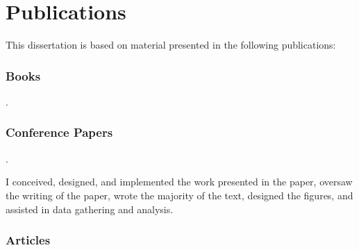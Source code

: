 \section{Publications}

This dissertation is based on material presented in the following publications:

\subsubsection{Books}

\begin{publications}
  \item {}
    .
\end{publications}

\subsubsection{Conference Papers}

\begin{publications}[resume]
  \item {}
    .
    \begin{authorsContribution}
      I conceived, designed, and implemented the work presented in the paper,
      oversaw the writing of the paper, wrote the majority of the text, designed
      the figures, and assisted in data gathering and analysis.
    \end{authorsContribution}
\end{publications}

\subsubsection{Articles}

